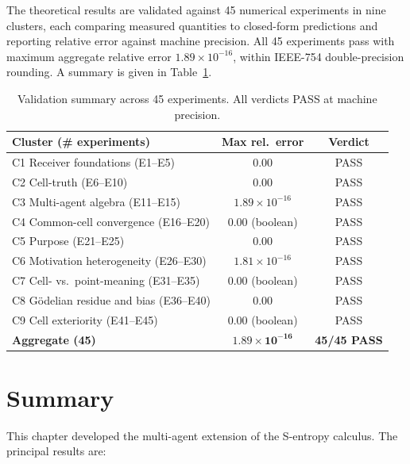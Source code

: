 The theoretical results are validated against 45 numerical experiments in
nine clusters, each comparing measured quantities to closed-form predictions
and reporting relative error against machine precision. All 45 experiments
pass with maximum aggregate relative error $1.89\times10^{-16}$, within
IEEE-754 double-precision rounding. A summary is given in
Table~\ref{tab:ch03-validation}.

\begin{table}[h!]\centering
\begin{tabular}{lcc}
\toprule
\textbf{Cluster (\# experiments)} & \textbf{Max rel.\ error} & \textbf{Verdict}\\
\midrule
C1 Receiver foundations (E1--E5)      & $0.00$                       & PASS \\
C2 Cell-truth (E6--E10)               & $0.00$                       & PASS \\
C3 Multi-agent algebra (E11--E15)     & $1.89\times10^{-16}$         & PASS \\
C4 Common-cell convergence (E16--E20) & $0.00$ (boolean)             & PASS \\
C5 Purpose (E21--E25)                 & $0.00$                       & PASS \\
C6 Motivation heterogeneity (E26--E30)& $1.81\times10^{-16}$        & PASS \\
C7 Cell- vs.\ point-meaning (E31--E35)& $0.00$ (boolean)             & PASS \\
C8 Gödelian residue and bias (E36--E40)& $0.00$                      & PASS \\
C9 Cell exteriority (E41--E45)        & $0.00$ (boolean)             & PASS \\
\midrule
\textbf{Aggregate (45)}               & $\mathbf{1.89\times10^{-16}}$& \textbf{45/45 PASS}\\
\bottomrule
\end{tabular}
\caption{Validation summary across 45 experiments. All verdicts PASS at
machine precision.}
\label{tab:ch03-validation}
\end{table}

\section{Summary}
\label{sec:ch03-summary}

This chapter developed the multi-agent extension of the S-entropy calculus.
The principal results are:

